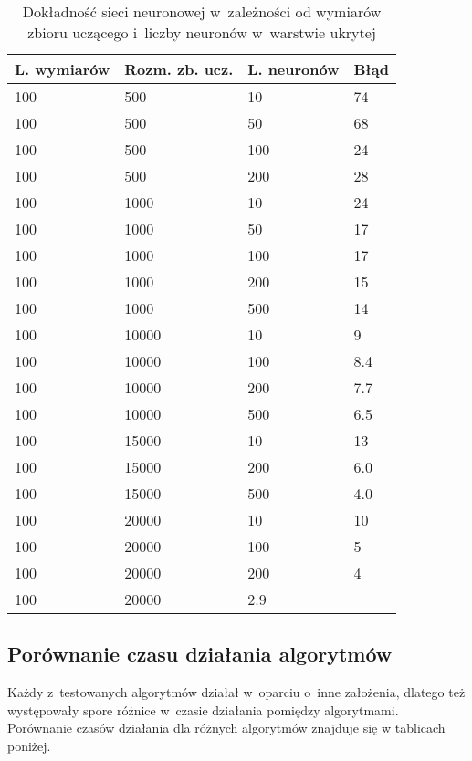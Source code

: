 \documentclass[12pt]{article}
\begin{document}
\begin{table}[H]
\begin{center}
  \begin{tabular}[H]{|l|l|l|l|}
  \hline 
  \rowcolor[gray]{0.9}L. wymiarów & Rozm. zb. ucz. & L. neuronów & Błąd  \\ \hline \hline
100 &        500  &10&   74     \\ \hline
100  &       500  &50&   68         \\ \hline
100   &      500  &100&   24         \\ \hline
100    &     500  &200&   28        \\ \hline
\hline
100  &       1000 &10&   24        \\ \hline
100   &      1000 &50&   17         \\ \hline
100    &     1000 &100&   17        \\ \hline
100     &    1000 &200&   15         \\ \hline
100      &   1000 &500&   14        \\ \hline
\hline
100  &       10000 &10&  9          \\ \hline
100   &      10000 &100&  8.4       \\ \hline
100    &     10000 &200&  7.7        \\ \hline
100   &      10000  &500& 6.5     \\ \hline
\hline
100  &       15000 &10&  13        \\ \hline
100   &      15000 &200&  6.0      \\ \hline
100    &     15000 &500&  4.0      \\ \hline
\hline
100   &      20000 &10&  10      \\ \hline
100    &     20000 &100&  5          \\ \hline
100     &    20000 &200&  4         \\ \hline
100      &   20000   &2.9&        \\ \hline
  \end{tabular} 
\end{center}
 \caption{Dokładność sieci neuronowej w~zależności od wymiarów zbioru uczącego i~liczby neuronów w~warstwie ukrytej} 
\label{tab: blad nn}
\end{table}


\subsection{Porównanie czasu działania algorytmów}
Każdy z~testowanych algorytmów działał w~oparciu o~inne założenia, dlatego też występowały spore różnice w~czasie działania pomiędzy algorytmami. Porównanie czasów działania dla różnych algorytmów znajduje się w tablicach poniżej.
 
\end{document}

